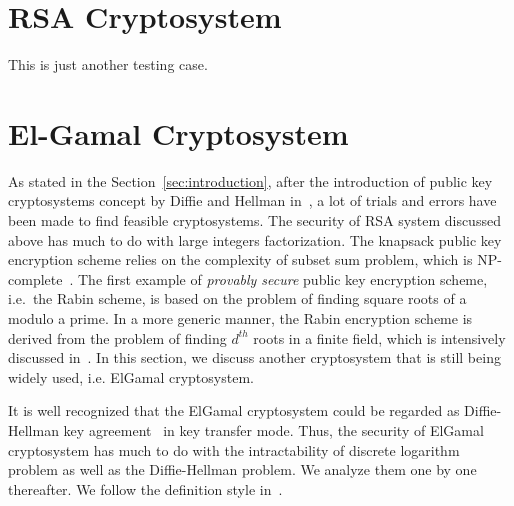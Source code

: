 \documentclass[12pt,journal,compsoc]{IEEEtran}
\begin{document}
\section{RSA Cryptosystem}
\label{sec:rsa-cryptosystem}


This is just another testing case.




\section{El-Gamal Cryptosystem}
\label{sec:el-gamal-crypt}
As stated in the Section~\ref{sec:introduction}, after the
introduction of public key cryptosystems concept by Diffie and Hellman
in~\cite{ref:Diffie1976}, a lot of trials and errors have been made to
find feasible cryptosystems. The security of RSA system discussed
above has much to do with large integers factorization. The knapsack
public key encryption scheme relies on the complexity of subset sum
problem, which is NP-complete~\cite{ref:Odlyzko1990}. The first
example of \emph{provably secure} public key encryption scheme,
i.e.\ the Rabin scheme, is based on the problem of finding square
roots of a modulo a prime. In a more generic manner, the Rabin
encryption scheme is derived from the problem of finding $d^{th}$
roots in a finite field, which is intensively discussed
in~\cite{ref:Bach1996}. In this section, we discuss another cryptosystem that
is still being widely used, i.e. ElGamal cryptosystem. 
\par
It is well recognized that the ElGamal cryptosystem could be regarded as
Diffie-Hellman key agreement~\cite{ref:Elgamal1985} in key transfer
mode. Thus, the security of ElGamal cryptosystem has much to do with
the intractability of discrete logarithm problem as well as the
Diffie-Hellman problem. We analyze them one by one thereafter. We
follow the definition style in~\cite{ref:menezes2010handbook}.
\end{document}
